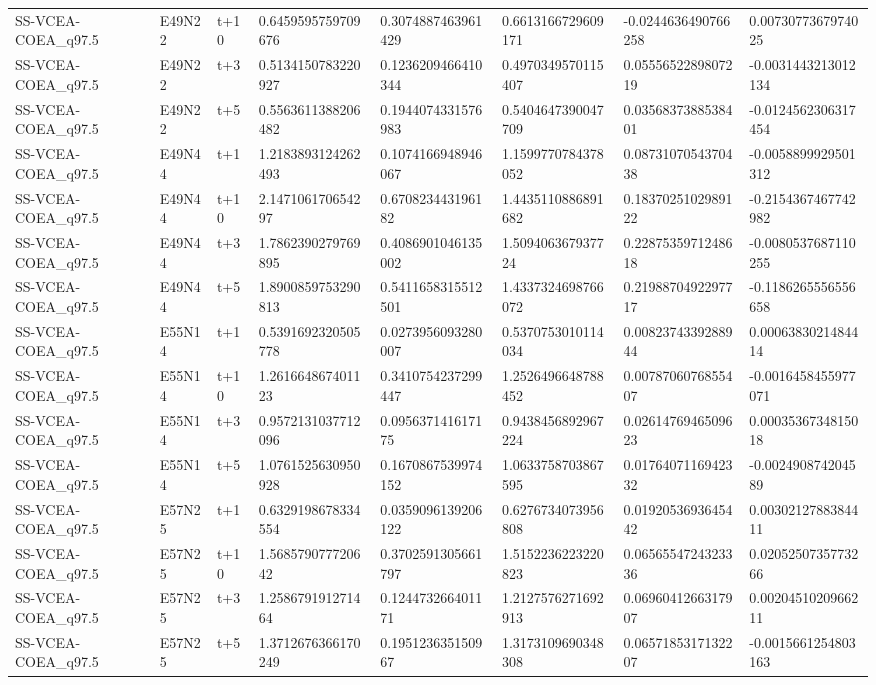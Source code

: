 \begin{landscape}
\begin{longtable}{llllllll}
SS-VCEA-COEA\_q97.5 & E49N22 & t+10 & 0.6459595759709676 & 0.3074887463961429 & 0.6613166729609171 & -0.0244636490766258 & 0.0073077367974025 \\
SS-VCEA-COEA\_q97.5 & E49N22 & t+3 & 0.5134150783220927 & 0.1236209466410344 & 0.4970349570115407 & 0.0555652289807219 & -0.0031443213012134 \\
SS-VCEA-COEA\_q97.5 & E49N22 & t+5 & 0.5563611388206482 & 0.1944074331576983 & 0.5404647390047709 & 0.0356837388538401 & -0.0124562306317454 \\
SS-VCEA-COEA\_q97.5 & E49N44 & t+1 & 1.2183893124262493 & 0.1074166948946067 & 1.1599770784378052 & 0.0873107054370438 & -0.0058899929501312 \\
SS-VCEA-COEA\_q97.5 & E49N44 & t+10 & 2.147106170654297 & 0.670823443196182 & 1.4435110886891682 & 0.1837025102989122 & -0.2154367467742982 \\
SS-VCEA-COEA\_q97.5 & E49N44 & t+3 & 1.7862390279769895 & 0.4086901046135002 & 1.509406367937724 & 0.2287535971248618 & -0.0080537687110255 \\
SS-VCEA-COEA\_q97.5 & E49N44 & t+5 & 1.8900859753290813 & 0.5411658315512501 & 1.4337324698766072 & 0.2198870492297717 & -0.1186265556556658 \\
SS-VCEA-COEA\_q97.5 & E55N14 & t+1 & 0.5391692320505778 & 0.0273956093280007 & 0.5370753010114034 & 0.0082374339288944 & 0.0006383021484414 \\
SS-VCEA-COEA\_q97.5 & E55N14 & t+10 & 1.261664867401123 & 0.3410754237299447 & 1.2526496648788452 & 0.0078706076855407 & -0.0016458455977071 \\
SS-VCEA-COEA\_q97.5 & E55N14 & t+3 & 0.9572131037712096 & 0.095637141617175 & 0.9438456892967224 & 0.0261476946509623 & 0.0003536734815018 \\
SS-VCEA-COEA\_q97.5 & E55N14 & t+5 & 1.0761525630950928 & 0.1670867539974152 & 1.0633758703867595 & 0.0176407116942332 & -0.002490874204589 \\
SS-VCEA-COEA\_q97.5 & E57N25 & t+1 & 0.6329198678334554 & 0.0359096139206122 & 0.6276734073956808 & 0.0192053693645442 & 0.0030212788384411 \\
SS-VCEA-COEA\_q97.5 & E57N25 & t+10 & 1.568579077720642 & 0.3702591305661797 & 1.5152236223220823 & 0.0656554724323336 & 0.0205250735773266 \\
SS-VCEA-COEA\_q97.5 & E57N25 & t+3 & 1.258679191271464 & 0.124473266401171 & 1.2127576271692913 & 0.0696041266317907 & 0.0020451020966211 \\
SS-VCEA-COEA\_q97.5 & E57N25 & t+5 & 1.3712676366170249 & 0.195123635150967 & 1.3173109690348308 & 0.0657185317132207 & -0.0015661254803163 \\

\end{longtable}
\end{landscape}
